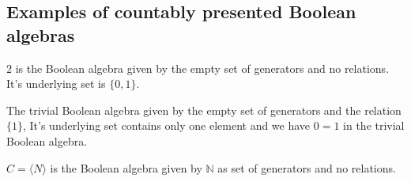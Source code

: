 \documentclass{../util/zariski-small}
\begin{document}
\subsection{Examples of countably presented Boolean algebras}
\begin{example}
  $2$ is the Boolean algebra given by the empty set of generators and no relations. 
    It's underlying set is $\{0,1\}$. 
\end{example}
\begin{example}
  The trivial Boolean algebra given by the empty set of generators and the relation $\{1\}$, 
  It's underlying set contains only one element and we have $0=1$ in the trivial Boolean algebra. 
\end{example}

\begin{example}\label{ExampleBAunderCantor}
  $C = \langle N \rangle $ is the Boolean algebra given by $\mathbb N$ as set of generators and no relations. 
\end{example}
\end{document}
